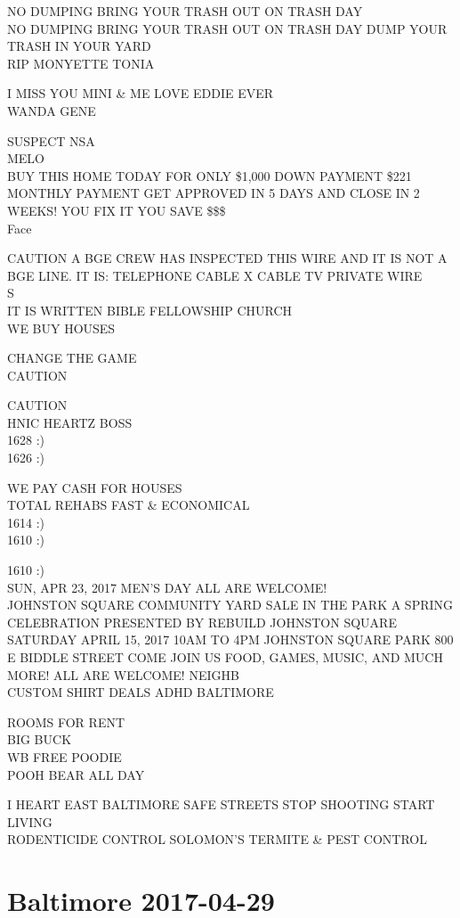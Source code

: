 \documentclass[10pt,letterpaper]{article}
\begin{document}
NO DUMPING BRING YOUR TRASH OUT ON TRASH DAY\\
NO DUMPING BRING YOUR TRASH OUT ON TRASH DAY DUMP YOUR TRASH IN YOUR YARD\\
RIP MONYETTE TONIA

I MISS YOU MINI \& ME LOVE EDDIE EVER\\
WANDA GENE

SUSPECT NSA\\
MELO\\
BUY THIS HOME TODAY FOR ONLY \$1,000 DOWN PAYMENT \$221 MONTHLY PAYMENT GET APPROVED IN 5 DAYS AND CLOSE IN 2 WEEKS!  YOU FIX IT YOU SAVE \$\$\$\\
Face

CAUTION A BGE CREW HAS INSPECTED THIS WIRE AND IT IS NOT A BGE LINE.  IT IS: TELEPHONE CABLE X CABLE TV PRIVATE WIRE\\
S\\
IT IS WRITTEN BIBLE FELLOWSHIP CHURCH\\
WE BUY HOUSES

CHANGE THE GAME\\
CAUTION

CAUTION\\
HNIC HEARTZ BOSS\\
1628 :)\\
1626 :)

WE PAY CASH FOR HOUSES\\
TOTAL REHABS FAST \& ECONOMICAL\\
1614 :)\\
1610 :)

1610 :)\\
SUN, APR 23, 2017 MEN'S DAY ALL ARE WELCOME!\\
JOHNSTON SQUARE COMMUNITY YARD SALE IN THE PARK A SPRING CELEBRATION PRESENTED BY REBUILD JOHNSTON SQUARE SATURDAY APRIL 15, 2017 10AM TO 4PM JOHNSTON SQUARE PARK 800 E BIDDLE STREET COME JOIN US FOOD, GAMES, MUSIC, AND MUCH MORE! ALL ARE WELCOME!  NEIGHB\\
CUSTOM SHIRT DEALS ADHD BALTIMORE

ROOMS FOR RENT\\
BIG BUCK\\
WB FREE POODIE\\
POOH BEAR ALL DAY

I HEART EAST BALTIMORE SAFE STREETS STOP SHOOTING START LIVING\\
RODENTICIDE CONTROL SOLOMON'S TERMITE \& PEST CONTROL


\section*{Baltimore 2017-04-29}
\end{document}
